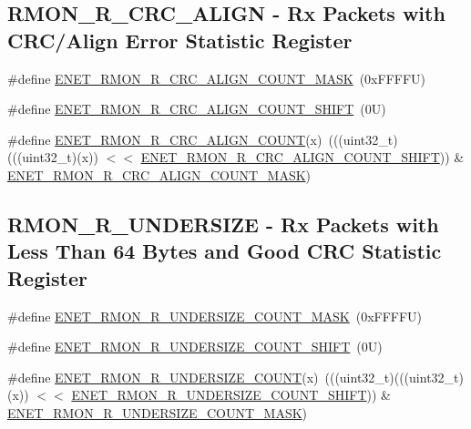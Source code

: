 \subsection*{R\+M\+O\+N\+\_\+\+R\+\_\+\+C\+R\+C\+\_\+\+A\+L\+I\+GN -\/ Rx Packets with C\+R\+C/\+Align Error Statistic Register}
\begin{DoxyCompactItemize}
\item 
\#define \mbox{\hyperlink{group___e_n_e_t___register___masks_ga281a3f038fe24ee481f4b620968e402f}{E\+N\+E\+T\+\_\+\+R\+M\+O\+N\+\_\+\+R\+\_\+\+C\+R\+C\+\_\+\+A\+L\+I\+G\+N\+\_\+\+C\+O\+U\+N\+T\+\_\+\+M\+A\+SK}}~(0x\+F\+F\+F\+F\+U)
\item 
\#define \mbox{\hyperlink{group___e_n_e_t___register___masks_gade379ca6709a28dd3014b9c0062145de}{E\+N\+E\+T\+\_\+\+R\+M\+O\+N\+\_\+\+R\+\_\+\+C\+R\+C\+\_\+\+A\+L\+I\+G\+N\+\_\+\+C\+O\+U\+N\+T\+\_\+\+S\+H\+I\+FT}}~(0\+U)
\item 
\#define \mbox{\hyperlink{group___e_n_e_t___register___masks_ga7ae15afbb7439b8f9879f90331f3679e}{E\+N\+E\+T\+\_\+\+R\+M\+O\+N\+\_\+\+R\+\_\+\+C\+R\+C\+\_\+\+A\+L\+I\+G\+N\+\_\+\+C\+O\+U\+NT}}(x)~(((uint32\+\_\+t)(((uint32\+\_\+t)(x)) $<$$<$ \mbox{\hyperlink{group___e_n_e_t___register___masks_gade379ca6709a28dd3014b9c0062145de}{E\+N\+E\+T\+\_\+\+R\+M\+O\+N\+\_\+\+R\+\_\+\+C\+R\+C\+\_\+\+A\+L\+I\+G\+N\+\_\+\+C\+O\+U\+N\+T\+\_\+\+S\+H\+I\+FT}})) \& \mbox{\hyperlink{group___e_n_e_t___register___masks_ga281a3f038fe24ee481f4b620968e402f}{E\+N\+E\+T\+\_\+\+R\+M\+O\+N\+\_\+\+R\+\_\+\+C\+R\+C\+\_\+\+A\+L\+I\+G\+N\+\_\+\+C\+O\+U\+N\+T\+\_\+\+M\+A\+SK}})
\end{DoxyCompactItemize}
\subsection*{R\+M\+O\+N\+\_\+\+R\+\_\+\+U\+N\+D\+E\+R\+S\+I\+ZE -\/ Rx Packets with Less Than 64 Bytes and Good C\+RC Statistic Register}
\begin{DoxyCompactItemize}
\item 
\#define \mbox{\hyperlink{group___e_n_e_t___register___masks_ga8a24b45ac31e9bb082d18e378e634dad}{E\+N\+E\+T\+\_\+\+R\+M\+O\+N\+\_\+\+R\+\_\+\+U\+N\+D\+E\+R\+S\+I\+Z\+E\+\_\+\+C\+O\+U\+N\+T\+\_\+\+M\+A\+SK}}~(0x\+F\+F\+F\+F\+U)
\item 
\#define \mbox{\hyperlink{group___e_n_e_t___register___masks_gaea02d213bcae36ffe06ff62931d8af0d}{E\+N\+E\+T\+\_\+\+R\+M\+O\+N\+\_\+\+R\+\_\+\+U\+N\+D\+E\+R\+S\+I\+Z\+E\+\_\+\+C\+O\+U\+N\+T\+\_\+\+S\+H\+I\+FT}}~(0\+U)
\item 
\#define \mbox{\hyperlink{group___e_n_e_t___register___masks_gaa7cdec7b69c65dc05143f3f864e6bbc4}{E\+N\+E\+T\+\_\+\+R\+M\+O\+N\+\_\+\+R\+\_\+\+U\+N\+D\+E\+R\+S\+I\+Z\+E\+\_\+\+C\+O\+U\+NT}}(x)~(((uint32\+\_\+t)(((uint32\+\_\+t)(x)) $<$$<$ \mbox{\hyperlink{group___e_n_e_t___register___masks_gaea02d213bcae36ffe06ff62931d8af0d}{E\+N\+E\+T\+\_\+\+R\+M\+O\+N\+\_\+\+R\+\_\+\+U\+N\+D\+E\+R\+S\+I\+Z\+E\+\_\+\+C\+O\+U\+N\+T\+\_\+\+S\+H\+I\+FT}})) \& \mbox{\hyperlink{group___e_n_e_t___register___masks_ga8a24b45ac31e9bb082d18e378e634dad}{E\+N\+E\+T\+\_\+\+R\+M\+O\+N\+\_\+\+R\+\_\+\+U\+N\+D\+E\+R\+S\+I\+Z\+E\+\_\+\+C\+O\+U\+N\+T\+\_\+\+M\+A\+SK}})
\end{DoxyCompactItemize}
